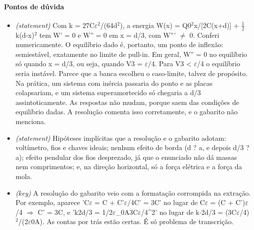 \documentclass{article}%
\begin{document}
\paragraph{Pontos de dúvida}%
\begin{itemize}%
\item%
\textit{(statement)} Com k = 27C$\varepsilon$$^2$/(64d$^2$), a energia W(x) = Q0$^2$x/{[}2C(x+d){]} + $\frac12$k(d-x)$^2$ tem W' = 0 e W'' = 0 em x = d/3, com W''' $\neq$ 0. Conferi numericamente. O equilíbrio dado é, portanto, um ponto de inflexão: semiestável, exatamente no limite de pull{-}in. Em geral, W'' = 0 no equilíbrio só quando x = d/3, ou seja, quando V3 = $\varepsilon$/4. Para V3 < $\varepsilon$/4 o equilíbrio seria instável. Parece que a banca escolheu o caso{-}limite, talvez de propósito. Na prática, um sistema com inércia passaria do ponto e as placas colapsariam, e um sistema superamortecido só chegaria a d/3 assintoticamente. As respostas não mudam, porque saem das condições de equilíbrio dadas. A resolução comenta isso corretamente, e o gabarito não menciona.%
\item%
\textit{(statement)} Hipóteses implícitas que a resolução e o gabarito adotam: voltímetro, fios e chaves ideais; nenhum efeito de borda (d ? a, e depois d/3 ? a); efeito pendular dos fios desprezado, já que o enunciado não dá massas nem comprimentos; e, na direção horizontal, só a força elétrica e a força da mola.%
\item%
\textit{(key)} A resolução do gabarito veio com a formatação corrompida na extração. Por exemplo, aparece 'C$\varepsilon$ = C + C'$\varepsilon$/4C' = 3C' no lugar de C$\varepsilon$ = (C + C')$\varepsilon$/4 $\Rightarrow$ C' = 3C, e 'k2d/3 = 1/2$\varepsilon$\_0A3C$\varepsilon$/4\^{}2' no lugar de k$\cdot$2d/3 = (3C$\varepsilon$/4)$^2$/(2$\varepsilon$0A). As contas por trás estão certas. É só problema de transcrição.%
\end{itemize}%
\end{document}
